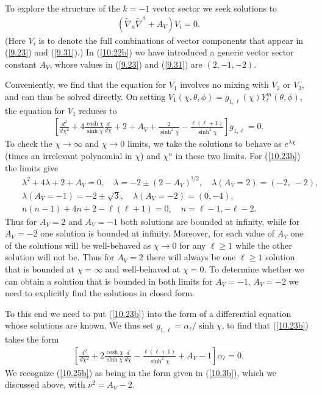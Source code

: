 % 
To explore the structure of the $k=-1$ vector sector we seek solutions to
%
\begin{eqnarray}
(\tilde{\nabla}_a\tilde{\nabla}^a+A_V)V_i=0.
\label{10.22b}
\end{eqnarray}
%
(Here $V_i$ is to denote the full combinations of vector components that appear in (\ref{9.23}) and (\ref{9.31}).) In (\ref{10.22b}) we have introduced a generic vector sector constant $A_V$, whose values in (\ref{9.23}) and (\ref{9.31})  are $(2,-1,-2)$.

Conveniently, we find that the equation for $V_1$ involves no mixing with $V_2$ or $V_3$, and can thus be solved directly. On setting $V_1(\chi,\theta,\phi)=g_{1,\ell}(\chi)Y_{\ell}^m(\theta,\phi)$, the equation for $V_1$ reduces to 
%
\begin{eqnarray}
\left[\frac{d^2}{d\chi^2}+4\frac{\cosh\chi}{ \sinh\chi}\frac{d }{d\chi}
+2+A_V+\frac{2 }{ \sinh^2\chi}-\frac{\ell(\ell+1)}{ \sinh^2\chi}\right]g_{1,\ell}=0.
\label{10.23b}
\end{eqnarray}
%
To check the $\chi \rightarrow \infty$ and $\chi \rightarrow 0$ limits, we take the solutions to behave as $e^{\lambda\chi}$ (times an irrelevant polynomial in $\chi$) and $\chi^n$ in these two limits. For (\ref{10.23b}) the limits give
%
\begin{eqnarray}
&&\lambda^2+4\lambda+2+A_V=0,\quad\lambda=-2\pm (2-A_V)^{!/2},\quad
\lambda(A_V=2)=(-2,~-2),
\nonumber\\
&& \lambda(A_V=-1)=-2\pm \surd{3},\quad \lambda(A_V=-2)=(0,-4),
\nonumber\\
&&
n(n-1)+4n+2-\ell(\ell+1)=0,\quad n=\ell-1, -\ell-2.
\label{10.24b}
\end{eqnarray}
%
Thus for $A_V=2$ and $A_V=-1$ both solutions are bounded at infinity, while for $A_V=-2$ one solution is bounded at infinity. Moreover, for each value of $A_V$ one of the solutions will  be well-behaved as $\chi\rightarrow 0$ for any $\ell\geq 1$ while the other solution will not be.  Thus for $A_V=2$ there will always be one $\ell\geq 1$ solution that is bounded at $\chi=\infty$ and well-behaved at $\chi=0$. To determine whether we can obtain a solution that is bounded in both limits for $A_V=-1$, $A_V=-2$ we need to explicitly find the solutions in closed form. 


To this end we need to put (\ref{10.23b})  into the form of a differential equation whose solutions are known. We thus set $g_{1,\ell}=\alpha_{\ell}/\sinh\chi$, to find that (\ref{10.23b}) takes the form
%
\begin{eqnarray}
\left[\frac{d^2 }{d\chi^2}+2\frac{\cosh\chi}{ \sinh\chi}\frac{d }{d\chi}
-\frac{\ell(\ell+1) }{\sinh^2\chi}+A_V-1\right]\alpha_{\ell}=0.
\label{10.25b}
\end{eqnarray}
%
We recognize (\ref{10.25b}) as being in the form given in  (\ref{10.3b}), which we discussed above, with $\nu^2=A_V-2$.



